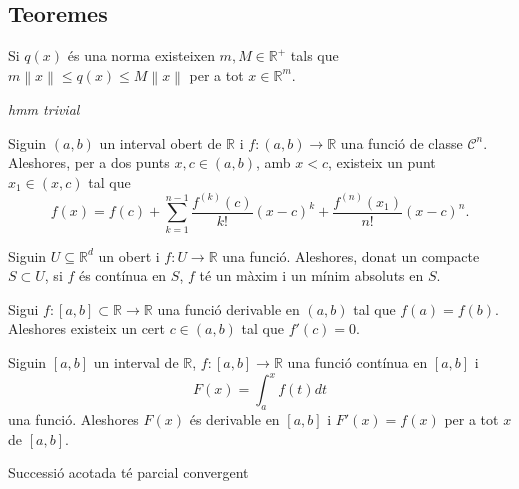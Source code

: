 \documentclass[../Apunts.tex]{subfiles}
\begin{document}
	\subsection{Teoremes}
	\begin{theorem}
		\label{thm:Equivalència de normes}
		Si \(q(x)\) és una norma existeixen \(m,M\in\mathbb{R}^{+}\) tals que \(m\left\lVert x\right\rVert\leq q(x)\leq M\left\lVert x\right\rVert\) per a tot \(x\in\mathbb{R}^{m}\).
	\end{theorem}
	\begin{theorem}
		\label{Teorema del Valor Mig}\label{thm:TVM}
		\emph{hmm trivial}
	\end{theorem}
	\begin{theorem}
		\label{thm:Desigualtat de C-S}
	\end{theorem}
	\begin{theorem}%
		\label{thm:Teorema de Taylor} %
		Siguin \((a,b)\) un interval obert de \(\mathbb{R}\) i \(f\colon(a,b)\rightarrow\mathbb{R}\) una funció de classe \(\mathcal{C}^{n}\). Aleshores, per a dos punts \(x,c\in(a,b)\), amb \(x<c\), existeix un punt \(x_{1}\in(x,c)\) tal que
		\[f(x)=f(c)+\sum_{k=1}^{n-1}\frac{f^{(k)}(c)}{k!}(x-c)^{k}+\frac{f^{(n)}(x_{1})}{n!}(x-c)^{n}.\]
	\end{theorem}
	\begin{theorem}
		\label{thm:Weierstrass màxims i mínims múltiples variables}
		Siguin \(U\subseteq\mathbb{R}^{d}\) un obert i \(f\colon U\to\mathbb{R}\) una funció. Aleshores, donat un compacte \(S\subset U\), si \(f\) és contínua en \(S\), \(f\) té un màxim i un mínim absoluts en \(S\).
	\end{theorem}
	\begin{theorem}
		\label{thm:sandvitx}
	\end{theorem}
	\begin{theorem}
		\label{thm:Teorema de Rolle}
		Sigui \(f\colon[a,b]\subset\mathbb{R}\longrightarrow\mathbb{R}\) una funció derivable en \((a,b)\) tal que \(f(a)=f(b)\). Aleshores existeix un cert \(c\in(a,b)\) tal que \(f'(c)=0\).
	\end{theorem}
	\begin{theorem}
		\label{thm:Teorema Fonamental del Càlcul}
		Siguin \([a,b]\) un interval de \(\mathbb{R}\), \(f\colon[a,b]\longrightarrow\mathbb{R}\) una funció contínua en \([a,b]\) i
		\[F(x)=\int_{a}^{x}f(t)dt\]
		una funció. Aleshores \(F(x)\) és derivable en \([a,b]\) i \(F'(x)=f(x)\) per a tot \(x\) de \([a,b]\).
	\end{theorem}
	\begin{theorem}
		\label{thm:Teorema de Bolzano-Weierstrass}
		Successió acotada té parcial convergent
	\end{theorem}
\end{document}
